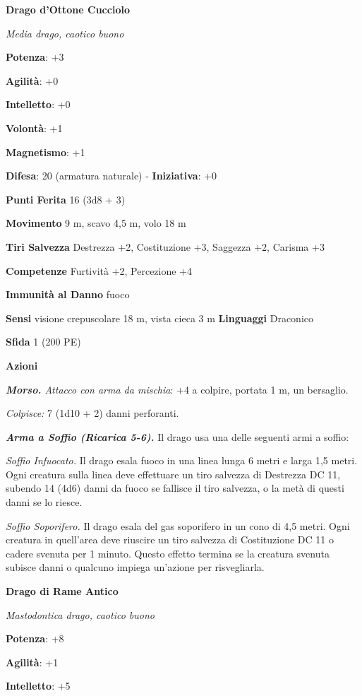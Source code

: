 \begin{multicols}{2}
\textbf{Drago d'Ottone Cucciolo}

\emph{Media drago, caotico buono}

\textbf{Potenza}: +3

\textbf{Agilità}: +0

\textbf{Intelletto}: +0

\textbf{Volontà}: +1

\textbf{Magnetismo}: +1

\textbf{Difesa}: 20 (armatura naturale) - \textbf{Iniziativa}: +0

\textbf{Punti Ferita} 16 (3d8 + 3)

\textbf{Movimento} 9 m, scavo 4,5 m, volo 18 m

\textbf{Tiri Salvezza} Destrezza +2, Costituzione +3, Saggezza +2,
Carisma +3

\textbf{Competenze} Furtività +2, Percezione +4

\textbf{Immunità al Danno} fuoco

\textbf{Sensi} visione crepuscolare 18 m, vista cieca 3 m
\textbf{Linguaggi} Draconico

\textbf{Sfida} 1 (200 PE)\smallskip

\smallskip\textbf{Azioni}

\emph{\textbf{Morso.} Attacco con arma da mischia}: +4 a colpire,
portata 1 m, un bersaglio.

\emph{Colpisce:} 7 (1d10 + 2) danni perforanti.

\emph{\textbf{Arma a Soffio (Ricarica 5-6).}} Il drago usa una delle
seguenti armi a soffio:

\emph{Soffio Infuocato.} Il drago esala fuoco in una linea lunga 6 metri
e larga 1,5 metri. Ogni creatura sulla linea deve effettuare un tiro
salvezza di Destrezza DC 11, subendo 14 (4d6) danni da fuoco se fallisce
il tiro salvezza, o la metà di questi danni se lo riesce.

\emph{Soffio Soporifero.} Il drago esala del gas soporifero in un cono
di 4,5 metri. Ogni creatura in quell'area deve riuscire un tiro salvezza
di Costituzione DC 11 o cadere svenuta per 1 minuto. Questo effetto
termina se la creatura svenuta subisce danni o qualcuno impiega
un'azione per risvegliarla.

\textbf{Drago di Rame Antico}

\emph{Mastodontica drago, caotico buono}

\textbf{Potenza}: +8

\textbf{Agilità}: +1

\textbf{Intelletto}: +5


\end{multicols}
